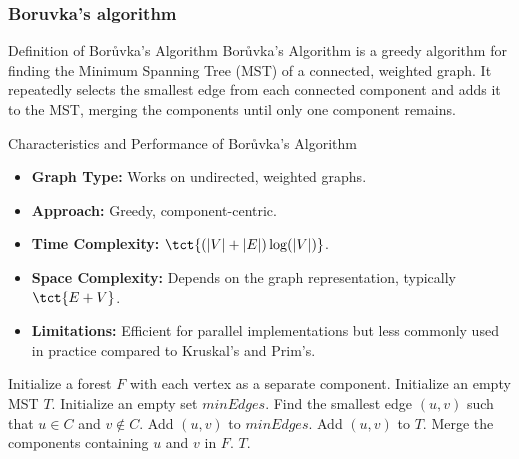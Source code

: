 \newpage
\subsubsection{Boruvka's algorithm}
\begin{definition}[]{Definition of Borůvka's Algorithm}
    Borůvka's Algorithm is a greedy algorithm for finding the Minimum Spanning Tree (MST) of a connected, weighted graph. It repeatedly selects the smallest edge from each connected component and adds it to the MST, merging the components until only one component remains.
\end{definition}

\begin{properties}[]{Characteristics and Performance of Borůvka's Algorithm}
    \begin{itemize}
        \item \textbf{Graph Type:} Works on undirected, weighted graphs.
        \item \textbf{Approach:} Greedy, component-centric.
        \item \textbf{Time Complexity:} $\tct{(|V| + |E|) \log(|V|)}$.
        \item \textbf{Space Complexity:} Depends on the graph representation, typically $\tct{E + V}$.
        \item \textbf{Limitations:} Efficient for parallel implementations but less commonly used in practice compared to Kruskal's and Prim's.
    \end{itemize}
\end{properties}

\begin{algorithm}
    \caption{Borůvka's Algorithm}
    \begin{algorithmic}[1]
            \State Initialize a forest $F$ with each vertex as a separate component.
            \State Initialize an empty MST $T$.
                \State Initialize an empty set $minEdges$.
                    \State Find the smallest edge $(u, v)$ such that $u \in C$ and $v \notin C$.
                    \State Add $(u, v)$ to $minEdges$.
                \EndFor
                        \State Add $(u, v)$ to $T$.
                        \State Merge the components containing $u$ and $v$ in $F$.
                    \EndIf
                \EndFor
            \EndWhile
            \State \Return $T$.
        \EndProcedure
    \end{algorithmic}
\end{algorithm}


